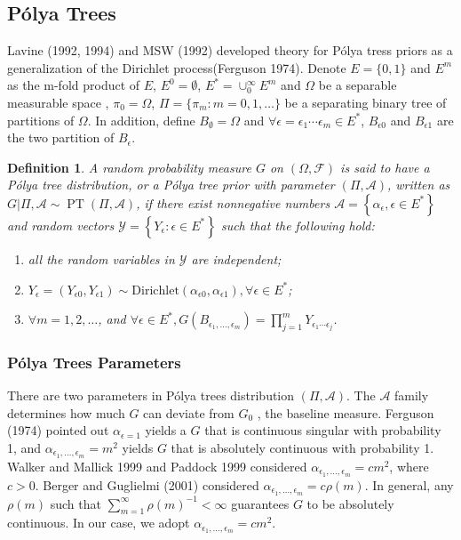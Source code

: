 \documentclass[12pt]{article}
\newtheorem{deff}[thm]{Definition}
\newcommand{\polya}{P\'{o}lya}
\DeclareMathOperator{\pt}{PT}
\begin{document}
\subsection{\polya{} Trees}
Lavine (1992, 1994) and MSW (1992) developed theory for
\polya{} tress priors as a generalization of the Dirichlet
process(Ferguson 1974). Denote $E=\{0,1\}$ and $E^m$ as the m-fold
product of $E$, $E^0= \emptyset$, $E^{*} = \cup_0^{\infty} E^m$ and $\Omega$ be a separable
measurable space , $\pi_0 = \Omega$, $\Pi= \{ \pi_m: m=0,1, \ldots \}
$ be a separating binary tree of partitions of $\Omega$. In addition,
define $B_{\emptyset} = \Omega$ and $\forall \epsilon=\epsilon_1\cdots
\epsilon_m \in E^{*}$, $B_{\epsilon 0}$ and $B_{\epsilon 1}$ are the
two partition of $B_{\epsilon}$.  
\begin{deff}
A random probability measure $G$ on $(\Omega, \mathcal{F})$ is said to
have a \polya{} tree distribution, or a \polya{} tree prior with
parameter $(\Pi, \mathcal{A})$, written as $G|\Pi, \mathcal{A} \sim
\pt (\Pi, \mathcal{A})$, if there exist nonnegative numbers
$\mathcal{A}= \left\{ \alpha_{\epsilon}, \epsilon \in E^{*} \right\}$
and random vectors $\mathcal{Y} = \left\{ Y_{\epsilon} : \epsilon \in
  E^{*} \right\}$ such that the following hold:
\begin{enumerate}
\item\label{item:1} all the random variables in $\mathcal{Y}$ are independent;
\item $Y_{\epsilon}= (Y_{\epsilon 0} , Y_{\epsilon 1}) \sim
  \mathrm{Dirichlet}(\alpha_{\epsilon 0 }, \alpha_{\epsilon 1}),
  \forall \epsilon \in E^{*}$;
\item $\forall m=1,2, \ldots$, and $\forall \epsilon \in E^{*},
  G(B_{\epsilon_{1}, \ldots, \epsilon_m}) = \prod_{j=1}^m Y_{\epsilon_1
    \cdots \epsilon_j}$.
\end{enumerate} 
\end{deff}

\subsubsection{\polya{} Trees Parameters}
There are two parameters in \polya{} trees distribution $(\Pi,
\mathcal{A})$. The $\mathcal{A}$ family determines how much $G$ can
deviate from $G_0$ , the baseline measure. Ferguson (1974) pointed out
$\alpha_{\epsilon = 1} $ yields a $G$ that is continuous singular with
probability 1, and $\alpha_{\epsilon_1, \ldots, \epsilon_m} = m^2$
yields $G$ that is absolutely continuous with probability 1. Walker
and Mallick 1999 and Paddock 1999 considered $\alpha_{\epsilon_1,
  \ldots, \epsilon_m} = cm^2$, where $c > 0$. Berger and  Guglielmi
(2001) considered $\alpha_{\epsilon_1, \ldots, \epsilon_m} = c
\rho(m)$. In general, any $\rho(m) $ such that $\sum_{m=1}^{\infty}
\rho(m)^{-1} < \infty$ guarantees $G$ to be absolutely continuous. In
our case, we adopt $\alpha_{\epsilon_1, \ldots, \epsilon_m} = cm^2$.
\end{document}
